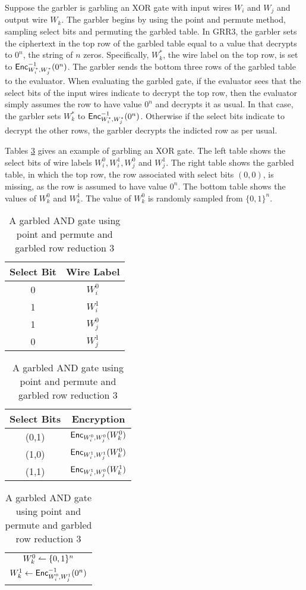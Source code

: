 Suppose the garbler is garbling an XOR gate with input wires $W_i$ and $W_j$ and output wire $W_k$.
The garbler begins by using the point and permute method, sampling select bits and permuting the garbled table.
In GRR3, the garbler sets the ciphertext in the top row of the garbled table equal to a value that decrypts to $0^n$, the string of $n$ zeros.
Specifically, $W_k^*$, the wire label on the top row, is set to $\textsf{Enc}^{-1}_{W_i^*, W_j^*}(0^n)$.
The garbler sends the bottom three rows of the garbled table to the evaluator.
When evaluating the garbled gate, if the evaluator sees that the select bits of the input wires indicate to decrypt the top row, then the evaluator simply assumes the row to have value $0^n$ and decrypts it as usual.
In that case, the garbler sets $W_k^*$ to $\textsf{Enc}^{-1}_{W_i^*, W_j^*}(0^n)$.
Otherwise if the select bits indicate to decrypt the other rows, the garbler decrypts the indicted row as per usual.

Tables \ref{tbl:grr3} gives an example of garbling an XOR gate.
The left table shows the select bits of wire labels $W_i^0, W_i^1, W_j^0$ and $W_j^1$.
The right table shows the garbled table, in which the top row, the row associated with select bits $(0,0)$, is missing, as the row is assumed to have value $0^n$.
The bottom table shows the values of $W_k^0$ and $W_k^1$.
The value of $W_k^0$ is randomly sampled from $\{0,1\}^n$.

\begin{table}
    \centering
    \begin{tabular}{|c|c|}
        \hline
        Select Bit & Wire Label \\
        \hline
        0 & $W_i^0$ \\
        1 & $W_i^1$ \\
        1 & $W_j^0$ \\
        0 & $W_j^1$ \\
        \hline
    \end{tabular}
    \qquad
    \begin{tabular}{|c|c|}
        \hline
        Select Bits & Encryption \\
        \hline
        (0,1) & $\textsf{Enc}_{W_i^0, W_j^0}(W_k^0)$ \\
        (1,0) & $\textsf{Enc}_{W_i^1, W_j^1}(W_k^0)$ \\
        (1,1) & $\textsf{Enc}_{W_i^1, W_j^0}(W_k^1)$ \\
        \hline
    \end{tabular}
    \qquad
    \begin{tabular}{|c|}
        \hline
        $W_k^0 \leftharpoonup \{0,1\}^n$ \\
        $W_k^1 \gets \textsf{Enc}_{W_i^0, W_j^1}^{-1}(0^n)$ \\
        \hline
    \end{tabular}
    \caption{A garbled AND gate using point and permute and garbled row reduction 3}
    \label{tbl:grr3}
\end{table}

